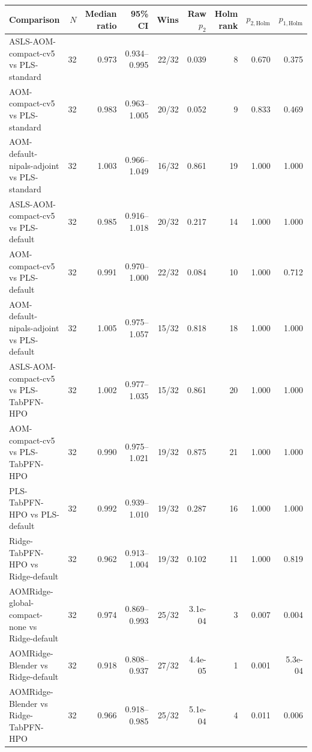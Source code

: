 \begin{tabularx}{\linewidth}{Xrrrrrrrr}
\toprule
Comparison & $N$ & Median ratio & 95\% CI & Wins & Raw $p_2$ & Holm rank & $p_{2,\mathrm{Holm}}$ & $p_{1,\mathrm{Holm}}$ \\
\midrule
ASLS-\allowbreak{}AOM-\allowbreak{}compact-\allowbreak{}cv5 vs PLS-\allowbreak{}standard & 32 & 0.973 & 0.934--0.995 & 22/32 & 0.039 & 8 & 0.670 & 0.375 \\
AOM-\allowbreak{}compact-\allowbreak{}cv5 vs PLS-\allowbreak{}standard & 32 & 0.983 & 0.963--1.005 & 20/32 & 0.052 & 9 & 0.833 & 0.469 \\
AOM-\allowbreak{}default-\allowbreak{}nipals-\allowbreak{}adjoint vs PLS-\allowbreak{}standard & 32 & 1.003 & 0.966--1.049 & 16/32 & 0.861 & 19 & 1.000 & 1.000 \\
ASLS-\allowbreak{}AOM-\allowbreak{}compact-\allowbreak{}cv5 vs PLS-\allowbreak{}default & 32 & 0.985 & 0.916--1.018 & 20/32 & 0.217 & 14 & 1.000 & 1.000 \\
AOM-\allowbreak{}compact-\allowbreak{}cv5 vs PLS-\allowbreak{}default & 32 & 0.991 & 0.970--1.000 & 22/32 & 0.084 & 10 & 1.000 & 0.712 \\
AOM-\allowbreak{}default-\allowbreak{}nipals-\allowbreak{}adjoint vs PLS-\allowbreak{}default & 32 & 1.005 & 0.975--1.057 & 15/32 & 0.818 & 18 & 1.000 & 1.000 \\
ASLS-\allowbreak{}AOM-\allowbreak{}compact-\allowbreak{}cv5 vs PLS-\allowbreak{}TabPFN-\allowbreak{}HPO & 32 & 1.002 & 0.977--1.035 & 15/32 & 0.861 & 20 & 1.000 & 1.000 \\
AOM-\allowbreak{}compact-\allowbreak{}cv5 vs PLS-\allowbreak{}TabPFN-\allowbreak{}HPO & 32 & 0.990 & 0.975--1.021 & 19/32 & 0.875 & 21 & 1.000 & 1.000 \\
PLS-\allowbreak{}TabPFN-\allowbreak{}HPO vs PLS-\allowbreak{}default & 32 & 0.992 & 0.939--1.010 & 19/32 & 0.287 & 16 & 1.000 & 1.000 \\
Ridge-\allowbreak{}TabPFN-\allowbreak{}HPO vs Ridge-\allowbreak{}default & 32 & 0.962 & 0.913--1.004 & 19/32 & 0.102 & 11 & 1.000 & 0.819 \\
AOMRidge-\allowbreak{}global-\allowbreak{}compact-\allowbreak{}none vs Ridge-\allowbreak{}default & 32 & 0.974 & 0.869--0.993 & 25/32 & 3.1e-04 & 3 & 0.007 & 0.004 \\
AOMRidge-\allowbreak{}Blender vs Ridge-\allowbreak{}default & 32 & 0.918 & 0.808--0.937 & 27/32 & 4.4e-05 & 1 & 0.001 & 5.3e-04 \\
AOMRidge-\allowbreak{}Blender vs Ridge-\allowbreak{}TabPFN-\allowbreak{}HPO & 32 & 0.966 & 0.918--0.985 & 25/32 & 5.1e-04 & 4 & 0.011 & 0.006 \\

\end{tabularx}
